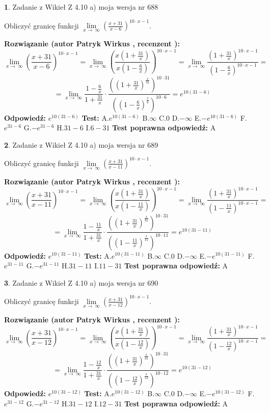 \documentclass[12pt, a4paper]{article}
\theoremstyle{definition} %
\newtheorem{zad}{}
\newcommand{\zadStart}[1]{\begin{zad}#1\newline}
\newcommand{\zadStop}{\end{zad}}
\newcommand{\rozwStart}[2]{\noindent \textbf{Rozwiązanie (autor #1 , recenzent #2): }\newline}
\newcommand{\rozwStop}{\newline}
\newcommand{\odpStart}{\noindent \textbf{Odpowiedź:}\newline}
\newcommand{\odpStop}{\newline}
\newcommand{\testStart}{\noindent \textbf{Test:}\newline}
\newcommand{\testStop}{\newline}
\newcommand{\kluczStart}{\noindent \textbf{Test poprawna odpowiedź:}\newline}
\newcommand{\kluczStop}{\newline}
\begin{document}
\zadStart{Zadanie z Wikieł Z 4.10 a) moja wersja nr 688}


Obliczyć granicę funkcji  $\lim\limits_{x\to\ \infty}(\frac{x+31}{x-6})^{10\cdot x-1}$.
\zadStop
\rozwStart{Patryk Wirkus}{}
$$\lim\limits_{x\to\ \infty}(\frac{x+31}{x-6})^{10\cdot x-1} = \lim\limits_{x\to\ \infty}(\frac{x(1+\frac{31}{x})}{x(1-\frac{6}{x})})^{10\cdot x-1}=\lim\limits_{x\to\ \infty}\frac{(1+\frac{31}{x})^{10\cdot x-1}}{(1-\frac{6}{x})^{10\cdot x-1}}=$$
$$=\lim\limits_{x\to\ \infty}\frac{1-\frac{6}{x}}{1+\frac{31}{x}}\cdot\frac{((1+\frac{31}{x})^{\frac{x}{31}})^{10\cdot31}}{((1-\frac{6}{x})^{\frac{x}{6}})^{10\cdot6}}=e^{10(31-6)}$$
\rozwStop
\odpStart
$e^{10(31-6)}$
\odpStop
\testStart
A.$e^{10(31-6)}$ B.$\infty$ C.$0$ D.$-\infty$ E.$-e^{10(31-6)}$
F.$e^{31-6}$ G.$-e^{31-6}$
H.$31-6$
I.$6-31$
\testStop
\kluczStart
A
\kluczStop



\zadStart{Zadanie z Wikieł Z 4.10 a) moja wersja nr 689}


Obliczyć granicę funkcji  $\lim\limits_{x\to\ \infty}(\frac{x+31}{x-11})^{10\cdot x-1}$.
\zadStop
\rozwStart{Patryk Wirkus}{}
$$\lim\limits_{x\to\ \infty}(\frac{x+31}{x-11})^{10\cdot x-1} = \lim\limits_{x\to\ \infty}(\frac{x(1+\frac{31}{x})}{x(1-\frac{11}{x})})^{10\cdot x-1}=\lim\limits_{x\to\ \infty}\frac{(1+\frac{31}{x})^{10\cdot x-1}}{(1-\frac{11}{x})^{10\cdot x-1}}=$$
$$=\lim\limits_{x\to\ \infty}\frac{1-\frac{11}{x}}{1+\frac{31}{x}}\cdot\frac{((1+\frac{31}{x})^{\frac{x}{31}})^{10\cdot31}}{((1-\frac{11}{x})^{\frac{x}{11}})^{10\cdot11}}=e^{10(31-11)}$$
\rozwStop
\odpStart
$e^{10(31-11)}$
\odpStop
\testStart
A.$e^{10(31-11)}$ B.$\infty$ C.$0$ D.$-\infty$ E.$-e^{10(31-11)}$
F.$e^{31-11}$ G.$-e^{31-11}$
H.$31-11$
I.$11-31$
\testStop
\kluczStart
A
\kluczStop



\zadStart{Zadanie z Wikieł Z 4.10 a) moja wersja nr 690}


Obliczyć granicę funkcji  $\lim\limits_{x\to\ \infty}(\frac{x+31}{x-12})^{10\cdot x-1}$.
\zadStop
\rozwStart{Patryk Wirkus}{}
$$\lim\limits_{x\to\ \infty}(\frac{x+31}{x-12})^{10\cdot x-1} = \lim\limits_{x\to\ \infty}(\frac{x(1+\frac{31}{x})}{x(1-\frac{12}{x})})^{10\cdot x-1}=\lim\limits_{x\to\ \infty}\frac{(1+\frac{31}{x})^{10\cdot x-1}}{(1-\frac{12}{x})^{10\cdot x-1}}=$$
$$=\lim\limits_{x\to\ \infty}\frac{1-\frac{12}{x}}{1+\frac{31}{x}}\cdot\frac{((1+\frac{31}{x})^{\frac{x}{31}})^{10\cdot31}}{((1-\frac{12}{x})^{\frac{x}{12}})^{10\cdot12}}=e^{10(31-12)}$$
\rozwStop
\odpStart
$e^{10(31-12)}$
\odpStop
\testStart
A.$e^{10(31-12)}$ B.$\infty$ C.$0$ D.$-\infty$ E.$-e^{10(31-12)}$
F.$e^{31-12}$ G.$-e^{31-12}$
H.$31-12$
I.$12-31$
\testStop
\kluczStart
A
\kluczStop
\end{document}
